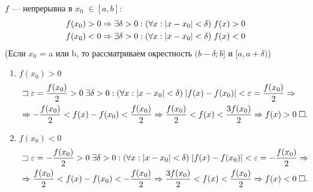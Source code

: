 \documentclass{article}
\begin{document}

\theorem

$f$ --- непрерывна в $x_0$ $\in [a,b]$:
\begin{align*}
	 & f(x_0)>0\Rightarrow\exists\delta>0:(\forall x:|x-x_0|<\delta)\;f(x)>0 \\
	 & f(x_0)<0\Rightarrow\exists\delta>0:(\forall x:|x-x_0|<\delta)\;f(x)<0
\end{align*}
(Если $x_0$ = a или b, то рассматриваем окрестность $(b-\delta; b]$ и $[a, a + \delta)$)

\proof

\begin{enumerate}
	\item{}$f(x_0)>0$
	\begin{align*}
		 & \sqsupset\varepsilon=\frac{f(x_0)}{2}>0\;\exists\delta>0:(\forall x:|x-x_0|<\delta)\;|f(x)-f(x_0)|<\varepsilon=\frac{f(x_0)}{2}\Rightarrow \\
		 & \Rightarrow -\frac{f(x_0)}{2}<f(x)-f(x_0)<\frac{f(x_0)}{2}\Rightarrow \frac{f(x_0)}{2}<f(x)<\frac{3f(x_0)}{2}\Rightarrow f(x)>0\;\square.
	\end{align*}
	\item{}$f(x_0)<0$
	\begin{align*}
		 & \sqsupset\varepsilon=-\frac{f(x_0)}{2}>0\;\exists\delta>0:(\forall x:|x-x_0|<\delta)\;|f(x)-f(x_0)|<\varepsilon=-\frac{f(x_0)}{2}\Rightarrow \\
		 & \Rightarrow \frac{f(x_0)}{2}<f(x)-f(x_0)<-\frac{f(x_0)}{2}\Rightarrow \frac{3f(x_0)}{2}<f(x)<\frac{f(x_0)}{2}\Rightarrow f(x)<0\;\square.
	\end{align*}
\end{enumerate}
\end{document}
